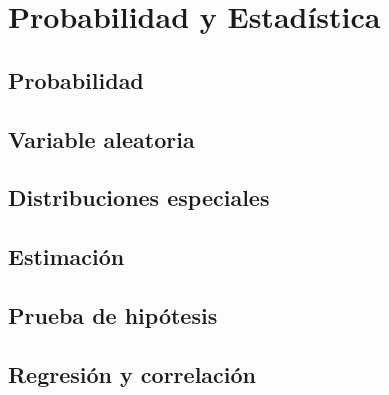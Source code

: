 %
%
%

\part{Probabilidad y Estadística}

\chapter{Probabilidad}
\chapter{Variable aleatoria}
\chapter{Distribuciones especiales}
\chapter{Estimación}
\chapter{Prueba de hipótesis}
\chapter{Regresión y correlación}


